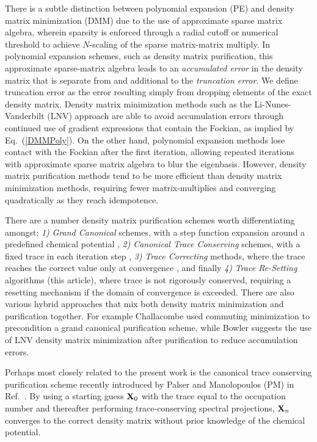 \commentoutA{\documentclass[prl,aps,twocolumn,showpacs,twocolumngrid,superbib]{revtex4}}
\begin{document}
There is a subtle distinction between polynomial expansion (PE) and density 
matrix minimization (DMM) due to the use of approximate sparse matrix algebra, wherein
sparsity is enforced through a radial cutoff or numerical threshold  to 
achieve $N$-scaling of the sparse matrix-matrix multiply. In polynomial expansion schemes, 
such as density matrix purification, 
this approximate sparse-matrix algebra leads to an {\em accumulated error} in the density matrix 
that is separate from and additional to the {\em truncation error}.  We define truncation error as the 
error resulting simply from dropping elements of the exact density matrix.  Density matrix 
minimization methods such as the Li-Nunes-Vanderbilt \cite{XLi93,DBowler99} (LNV) approach are able to 
avoid accumulation errors through continued use of gradient expressions that contain the Fockian, 
as implied by Eq.~(\ref{DMMPoly}). On the other hand, polynomial expansion methods lose contact 
with the Fockian after the first iteration, allowing repeated iterations with 
approximate sparse matrix algebra to blur the eigenbasis.  However, density matrix purification 
methods tend to be more efficient than density matrix minimization methods, requiring fewer 
matrix-multiplies and converging quadratically as they reach idempotence.

There are a number density matrix purification schemes worth differentiating amongst: 
{\it 1)} {\it Grand Canonical} schemes, with a step function  expansion around a predefined 
         chemical potential \cite{RMcWeeny60,APalser99,AHolas01,ANiklasson02A,ANiklasson02B},
{\it 2)} {\it Canonical Trace Conserving} schemes, with a fixed trace
         in each iteration step \cite{APalser99}, 
{\it 3)} {\it Trace Correcting} methods, where the trace reaches the correct value only at 
         convergence \cite{ANiklasson02A}, and finally 
{\it 4)} {\it Trace Re-Setting} algorithms (this article), where trace is not rigorously conserved,
          requiring a resetting  mechanism if the domain of convergence is exceeded.
There are also various hybrid approaches that mix both density matrix minimization and 
purification together.  For example Challacombe\cite{MChallacombe99} used  commuting 
minimization  to precondition a grand canonical purification scheme,
while Bowler \cite{DBowler99} suggests the use of LNV density matrix minimization 
after purification to reduce accumulation errors.

Perhaps most closely related to the present work is the canonical trace 
conserving purification scheme recently introduced by Palser and Manolopoulos 
(PM) in Ref.~. 
By using a starting guess ${\bf X}_0$ with the trace equal to 
the occupation number and thereafter performing trace-conserving
spectral projections, ${\bf X}_n$ converges to the correct density matrix without
prior knowledge of the chemical potential. 
\end{document}
